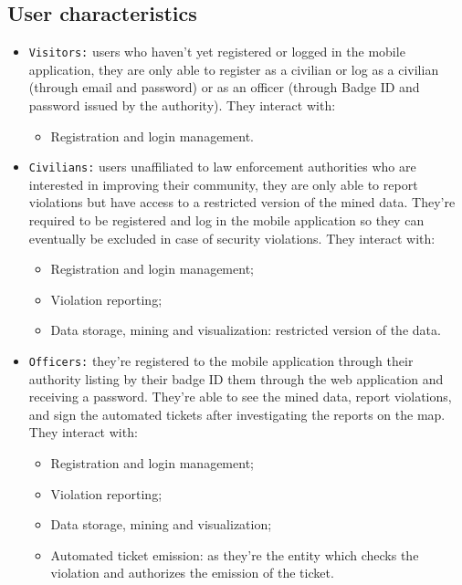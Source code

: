 \documentclass[12pt,a4paper]{article}
\begin{document}
\subsection{User characteristics}
 \begin{itemize}
\item \texttt{Visitors:} users who haven't yet registered or logged in the mobile application, they are only able to register as a civilian or log as a civilian (through email and password) or as an officer (through Badge ID and password issued by the authority). They interact with:
		\begin{itemize}
			\item Registration and login management.
		\end{itemize}

\item \texttt{Civilians:} users unaffiliated to law enforcement authorities who are interested in improving their community, they are only able to report violations but have access to a restricted version of the mined data. They're required to be registered and log in the mobile application so they can eventually be excluded in case of security violations. They interact with: 
		\begin{itemize}
			\item Registration and login management;
			\item Violation reporting;
			\item Data storage, mining and visualization: restricted version of the data.
		\end{itemize}
 
\item \texttt{Officers:} they're registered to the mobile application through their authority listing by their badge ID them through the web application and receiving a password. They're able to see the mined data, report violations, and sign the automated tickets after investigating the reports on the map.  They interact with: 
		\begin{itemize}
			\item Registration and login management;
			\item Violation reporting;
			\item Data storage, mining and visualization;
			\item Automated ticket emission: as they're the entity which checks the violation and authorizes the emission of the ticket.
		\end{itemize}


\end{itemize}
\end{document}
